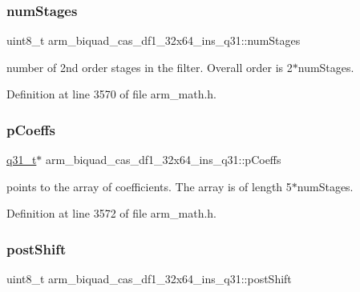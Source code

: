 \subsubsection{\texorpdfstring{num\+Stages}{numStages}}
{\footnotesize\ttfamily uint8\+\_\+t arm\+\_\+biquad\+\_\+cas\+\_\+df1\+\_\+32x64\+\_\+ins\+\_\+q31\+::num\+Stages}

number of 2nd order stages in the filter. Overall order is 2$\ast$num\+Stages. 

Definition at line 3570 of file arm\+\_\+math.\+h.

\mbox{\label{structarm__biquad__cas__df1__32x64__ins__q31_a490462d6ebe0fecfb6acbf51bed22ecf}} 
\subsubsection{\texorpdfstring{p\+Coeffs}{pCoeffs}}
{\footnotesize\ttfamily \hyperlink{arm__math_8h_adc89a3547f5324b7b3b95adec3806bc0}{q31\+\_\+t}$\ast$ arm\+\_\+biquad\+\_\+cas\+\_\+df1\+\_\+32x64\+\_\+ins\+\_\+q31\+::p\+Coeffs}

points to the array of coefficients. The array is of length 5$\ast$num\+Stages. 

Definition at line 3572 of file arm\+\_\+math.\+h.

\mbox{\label{structarm__biquad__cas__df1__32x64__ins__q31_a8e9d58e8dba5aa3b2fc4f36d2ed07996}} 
\subsubsection{\texorpdfstring{post\+Shift}{postShift}}
{\footnotesize\ttfamily uint8\+\_\+t arm\+\_\+biquad\+\_\+cas\+\_\+df1\+\_\+32x64\+\_\+ins\+\_\+q31\+::post\+Shift}

